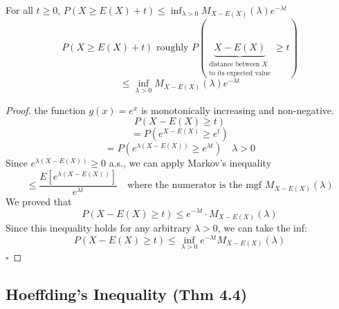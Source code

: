 \begin{reqproof}
\begin{theorem}
    For all $t\geq 0$, \quad $P(X\geq E(X) + t) \leq \inf_{\lambda>0}M_{X - E(X)} (\lambda)e^{-\lambda t}$
    \[P(X\geq E(X) + t) \text{ roughly } P(\underbrace{X-E(X)}_{\substack{\text{distance between $X$} \\ \text{to its expected value}}}\geq t)\]
    \[\leq \inf_{\lambda>0} M_{X-E(X)} (\lambda)e^{-\lambda t}\]
    \begin{proof}
        the function $g(x) = e^x$ is monotonically increasing and non-negative.
        \[P(X-E(X) \geq t)\]
        \[=P(e^{X-E(X)} \geq e^t)\]
        \[=P(e^{\lambda(X-E(X))}\geq e^{\lambda t}) \quad \lambda > 0\]
        Since $e^{\lambda(X-E(X))} \geq 0$ a.s., we can apply Markov's inequality
        \[\leq \frac{E[e^{\lambda (X - E(X))}]}{e^{\lambda t}} \quad \text{where the numerator is the mgf } M_{X-E(X)}(\lambda)\]
        We proved that
        \[P(X-E(X) \geq t) \leq e^{-\lambda t} \cdot M_{X-E(X)}(\lambda)\]
        Since this inequality holds for any arbitrary $\lambda > 0$, we can take the inf:
        \[P(X-E(X) \geq t) \leq \inf_{\lambda>0}e^{-\lambda t}M_{X-E(X)}(\lambda)\]
        \hfill $\square$
    \end{proof}
\end{theorem}
\end{reqproof}

\subsection{Hoeffding's Inequality (Thm 4.4)}

